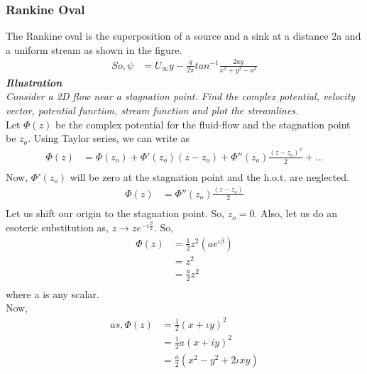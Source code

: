 \documentclass{book}
\begin{document}
\subsubsection{Rankine Oval}
The Rankine oval is the superposition of a source and a sink at a distance 2a and a uniform stream as shown in the figure.
\begin{equation*}
\begin{split}
So, \psi&=U_{\infty}y-\frac{q}{2\pi}tan^{-1}{\frac{2ay}{x^2+y^2-a^2}}
\end{split}
\end{equation*}
\textbf{\textit{Illustration}}\\
\textit{Consider a 2D flow near a stagnation point. Find the complex potential, velocity vector, potential function, stream function and plot the streamlines.}\\
Let $\Phi(z)$ be the complex potential for the fluid-flow and the stagnation point be $z_o$. Using Taylor series, we can write as \textemdash\\
\begin{equation*}
\begin{split}
\Phi(z)&=\Phi(z_o)+\Phi '(z_o)(z-z_o)+\Phi ''(z_o)\frac{(z-z_o)^2}{2}+...\\
\end{split}
\end{equation*}
Now, $\Phi '(z_o)$ will be zero at the stagnation point and the h.o.t. are neglected.
\begin{equation*}
\begin{split}
\Phi(z)&=\Phi''(z_o)\frac{(z-z_o)}{2}\\
\end{split}
\end{equation*}
Let us shift our origin to the stagnation point. So, $z_o=0$. Also, let us do an esoteric substitution as, $z\rightarrow ze^{-\iota \frac{\beta}{2}}$. 
So,\\
\begin{equation*}
\begin{split}
\Phi(z)&=\frac{1}{2}z^2(ae^{\iota\beta})\\
&=z^2\\
&=\frac{a}{2}z^2\\
\end{split}
\end{equation*}
where a is any scalar.\\
Now,
\begin{equation*}
\begin{split}
as, \Phi(z)&=\frac{1}{2}(x+\iota y)^2\\
&=\frac{1}{2}a(x+iy)^2\\
&=\frac{a}{2}(x^2-y^2+2\iota x y)\\
\end{split}
\end{equation*}
\end{document}
